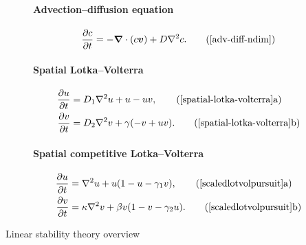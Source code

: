 \documentclass[main.tex]{subfiles}
\begin{document}
\begin{figure}
\paragraph{Advection--diffusion equation}
\begin{equation}
\pd{c}{t} = -\vgrad\cdot(c\v{v})  + D\nabla^2 c.
\tag{\ref*{adv-diff-ndim}}
\end{equation}

\paragraph{Spatial Lotka--Volterra}
\begin{subequations}
\begin{align}
\pd{u}{t} &= D_1 \nabla^2 u + u- uv, \tag{\ref*{spatial-lotka-volterra}a}\\
 \pd{v}{t} &=  D_2 \nabla^2 v +\gamma(-v+ uv). \tag{\ref*{spatial-lotka-volterra}b}
\end{align}
\end{subequations}

\paragraph{Spatial competitive Lotka--Volterra}
\begin{subequations}
\begin{align}
\pd{u}{t} &= \nabla^2 u +u(1-u-\gamma_1v), \tag{\ref*{scaledlotvolpursuit}a}\\
\pd{v}{t} &= \kappa\nabla^2 v + \beta v(1-v-\gamma_2u). \tag{\ref*{scaledlotvolpursuit}b}
\end{align}
\end{subequations}

\label{fig:key-equations}
\end{figure}

\newpage
\begin{center} 
\textsf{\Large Linear stability theory overview}
\end{center}
\end{document}
